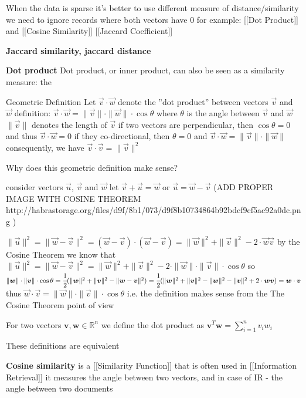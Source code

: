 When the data is sparse it's better to use different measure of distance/similarity
we need to ignore records where both vectors have 0
for example:
[[Dot Product]] and [[Cosine Similarity]]
[[Jaccard Coefficient]]



\textbf{Jaccard similarity, jaccard distance}

\textbf{Dot product}
Dot product, or inner product, can also be seen as a similarity measure: the 



Geometric Definition
Let $\vec v \cdot \vec w$ denote the ''dot product'' between vectors $\vec v$ and $\vec w$
definition: $\vec v \cdot \vec w = \| \vec v \| \cdot \| \vec w \| \cdot \cos \theta$ where $\theta$ is the angle between $\vec v$ and $\vec w$
$\| \vec v \|$ denotes the length of $\vec v$
 if two vectors are perpendicular, then $\cos \theta = 0$ and thus $\vec v \cdot \vec w = 0$
 if they co-directional, then $\theta = 0$ and $\vec v \cdot \vec w = \| \vec v \| \cdot \| \vec w \|$
 consequently, we have $\vec v \cdot \vec v = \| \vec v \|^2$


Why does this geometric definition make sense?

consider vectors $\vec u$, $\vec v$ and $\vec w$
let $\vec v + \vec u = \vec w$ or $\vec u = \vec w - \vec v$
(ADD PROPER IMAGE WITH COSINE THEOREM 
http://habrastorage.org/files/d9f/8b1/073/d9f8b10734864b92bdcf9cf5ac92a0dc.png
)

$\| \vec u \|^2 =  \| \vec w - \vec v \|^2 = (\vec w - \vec v) \cdot (\vec w - \vec v) = \| \vec w \|^2 + \| \vec v \|^2 - 2 \cdot \vec w \vec v$
by the Cosine Theorem we know that
$\| \vec u \|^2 =  \| \vec w - \vec v \|^2 = \| \vec w \|^2 + \| \vec v \|^2 - 2 \cdot \| \vec w \| \cdot \| \vec v \| \cdot \cos \theta$
so $\| \vec w \| \cdot \| \vec v \| \cdot \cos \theta = \cfrac{1}{2} (\| \vec w \|^2 + \| \vec v \|^2 - \| \vec w - \vec v \|^2) = \cfrac{1}{2} (\| \vec w \|^2 + \| \vec v \|^2 - \| \vec w \|^2 - \| \vec v \|^2 + 2 \cdot \vec w \vec v) = \vec w \cdot \vec v$
thus $\vec w \cdot \vec v = \| \vec w \| \cdot \| \vec v \| \cdot \cos \theta$
i.e. the definition makes sense from the The Cosine Theorem point of view


For two vectors $\mathbf v, \mathbf w \in \mathbb R^n$ we define the dot product as $\mathbf v^T \mathbf w = \sum\limits_{i = 1}^n v_i w_i$

These definitions are equivalent


\textbf{Cosine similarity} is a [[Similarity Function]] that is often used in [[Information Retrieval]]
 it measures the angle between two vectors,  and in case of IR - the angle between two documents

